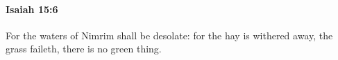 
		\paragraph{Isaiah 15:6} %
			\label{ISAIAH-15-6}

			For the waters of Nimrim shall be desolate: for the hay is withered away, the grass faileth, there is no green thing.


